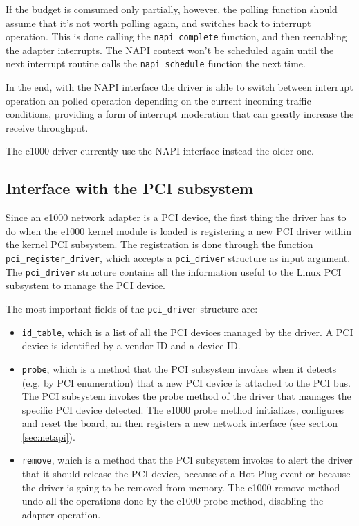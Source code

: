 If the budget is comsumed only partially, however, the polling function should assume that it's not worth polling again, and switches back
to interrupt operation. This is done calling the \texttt{napi\_complete} function, and then reenabling the adapter interrupts. The NAPI
context won't be scheduled again until the next interrupt routine calls the \texttt{napi\_schedule} function the next time.

\vspace{0.5cm}

In the end, with the NAPI interface the driver is able to switch between interrupt operation an polled operation depending on the current
incoming traffic conditions, providing a form of interrupt moderation that can greatly increase the receive throughput.

The e1000 driver currently use the NAPI interface instead the older one.


\subsection{Interface with the PCI subsystem}
Since an e1000 network adapter is a PCI device, the first thing the driver has to do when the e1000 kernel module is loaded is 
registering a new PCI driver within the kernel PCI subsystem. The registration is done through the function \texttt{pci\_register\_driver},
which accepts a \texttt{pci\_driver} structure as input argument.
The \texttt{pci\_driver} structure contains all the information useful to the Linux PCI subsystem to manage the PCI device.

\vspace{0.5cm}

The most important fields of the \texttt{pci\_driver} structure are:
\begin{itemize}
    \item \texttt{id\_table}, which is a list of all the PCI devices managed by the driver. A PCI device is identified by
	  a vendor ID and a device ID.
    \item \texttt{probe}, which is a method that the PCI subsystem invokes when it detects (e.g. by PCI enumeration) that a new PCI
	  device is attached to the PCI bus. The PCI subsystem invokes the probe method of the driver that manages the specific PCI device
	  detected. The e1000 probe method initializes, configures and reset the board, an then registers a new network interface (see
	  section \ref{sec:netapi}).
    \item \texttt{remove}, which is a method that the PCI subsystem invokes to alert the driver that it should release the PCI device,
	  because of a Hot-Plug event or because the driver is going to be removed from memory. The e1000 remove method undo all the
	  operations done by the e1000 probe method, disabling the adapter operation.
\end{itemize}

